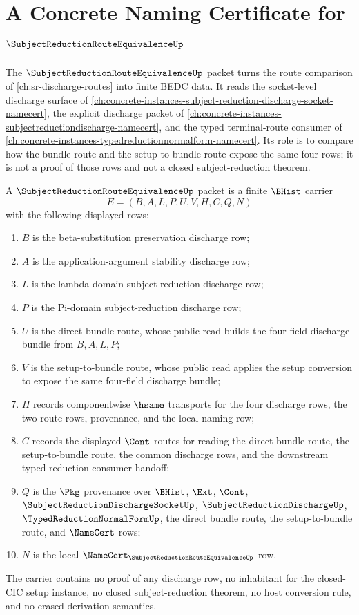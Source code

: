 \chapter{A Concrete Naming Certificate for $\SubjectReductionRouteEquivalenceUp$}
\label{ch:concrete-instances-subject-reduction-route-equivalence-namecert}

The $\SubjectReductionRouteEquivalenceUp$ packet turns the route comparison of \autoref{ch:sr-discharge-routes} into finite BEDC data. It reads the socket-level discharge surface of \autoref{ch:concrete-instances-subject-reduction-discharge-socket-namecert}, the explicit discharge packet of \autoref{ch:concrete-instances-subjectreductiondischarge-namecert}, and the typed terminal-route consumer of \autoref{ch:concrete-instances-typedreductionnormalform-namecert}. Its role is to compare how the bundle route and the setup-to-bundle route expose the same four rows; it is not a proof of those rows and not a closed subject-reduction theorem.

\begin{definition}
\label{def:subject-reduction-route-equivalence-packet}
A $\SubjectReductionRouteEquivalenceUp$ packet is a finite $\BHist$ carrier
$$
E=(B,A,L,P,U,V,H,C,Q,N)
$$
with the following displayed rows:
\begin{enumerate}
\item $B$ is the beta-substitution preservation discharge row;
\item $A$ is the application-argument stability discharge row;
\item $L$ is the lambda-domain subject-reduction discharge row;
\item $P$ is the Pi-domain subject-reduction discharge row;
\item $U$ is the direct bundle route, whose public read builds the four-field discharge bundle from $B,A,L,P$;
\item $V$ is the setup-to-bundle route, whose public read applies the setup conversion to expose the same four-field discharge bundle;
\item $H$ records componentwise $\hsame$ transports for the four discharge rows, the two route rows, provenance, and the local naming row;
\item $C$ records the displayed $\Cont$ routes for reading the direct bundle route, the setup-to-bundle route, the common discharge rows, and the downstream typed-reduction consumer handoff;
\item $Q$ is the $\Pkg$ provenance over $\BHist$, $\Ext$, $\Cont$, $\SubjectReductionDischargeSocketUp$, $\SubjectReductionDischargeUp$, $\TypedReductionNormalFormUp$, the direct bundle route, the setup-to-bundle route, and $\NameCert$ rows;
\item $N$ is the local $\NameCert_{\SubjectReductionRouteEquivalenceUp}$ row.
\end{enumerate}
The carrier contains no proof of any discharge row, no inhabitant for the closed-CIC setup instance, no closed subject-reduction theorem, no host conversion rule, and no erased derivation semantics.
\end{definition}

